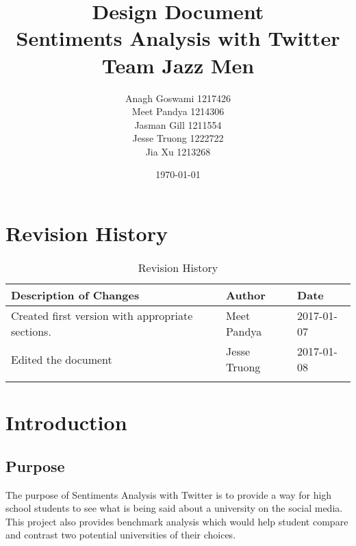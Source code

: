 \documentclass[12pt, titlepage]{article}
\begin{document}
\title{Design Document\\  Sentiments Analysis with Twitter \\Team Jazz Men}
\author{Anagh Goswami 1217426 \\ Meet Pandya 1214306 \\ Jasman Gill  1211554 \\ Jesse Truong  1222722 \\ Jia Xu  1213268 \\}
\date{\today}
\maketitle


\newpage

\tableofcontents
\newpage
{}
\restoregeometry

\section{Revision History}

\begin{table}[h]
\centering
\caption{Revision History}
\begin{tabular}{|l|l|l|}
\Xhline{3\arrayrulewidth}
\bf Description of Changes & \bf Author & \bf Date\\\hline
Created first version with appropriate sections. & Meet Pandya & 2017-01-07\\\midrule
Edited the document &Jesse Truong &2017-01-08\\\bottomrule
\Xhline{3\arrayrulewidth}
\end{tabular}
\end{table}

\pagebreak


\section{Introduction}

\subsection{Purpose}
The purpose of Sentiments Analysis with Twitter is to provide a way for high school students to see what is being said about a university on the social media. This project also provides benchmark analysis which would help student compare and contrast two potential universities of their choices.
\end{document}
